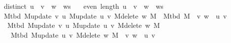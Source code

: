 \begin{isabellebody}
\ \ \ {\isachardoublequoteopen}distinct\ {\isacharparenleft}{\kern0pt}u\ {\isacharhash}{\kern0pt}\ v\ {\isacharhash}{\kern0pt}\ w\ {\isacharhash}{\kern0pt}\ ws{\isacharparenright}{\kern0pt}{\isachardoublequoteclose}\isanewline
\ \ \ {\isachardoublequoteopen}even\ {\isacharparenleft}{\kern0pt}length\ {\isacharparenleft}{\kern0pt}u\ {\isacharhash}{\kern0pt}\ v\ {\isacharhash}{\kern0pt}\ w\ {\isacharhash}{\kern0pt}\ ws{\isacharparenright}{\kern0pt}{\isacharparenright}{\kern0pt}{\isachardoublequoteclose}\isanewline
\ \ \ {\isachardoublequoteopen}M{\isacharunderscore}{\kern0pt}tbd\ {\isacharparenleft}{\kern0pt}M{\isacharunderscore}{\kern0pt}update\ v\ u\ {\isacharparenleft}{\kern0pt}M{\isacharunderscore}{\kern0pt}update\ u\ v\ {\isacharparenleft}{\kern0pt}M{\isacharunderscore}{\kern0pt}delete\ w\ M{\isacharparenright}{\kern0pt}{\isacharparenright}{\kern0pt}{\isacharparenright}{\kern0pt}\ {\isacharequal}{\kern0pt}\ M{\isacharunderscore}{\kern0pt}tbd\ M\ {\isacharminus}{\kern0pt}\ {\isacharbraceleft}{\kern0pt}{\isacharbraceleft}{\kern0pt}v{\isacharcomma}{\kern0pt}\ w{\isacharbraceright}{\kern0pt}{\isacharbraceright}{\kern0pt}\ {\isasymunion}\ {\isacharbraceleft}{\kern0pt}{\isacharbraceleft}{\kern0pt}u{\isacharcomma}{\kern0pt}\ v{\isacharbraceright}{\kern0pt}{\isacharbraceright}{\kern0pt}{\isachardoublequoteclose}%
\endisataginvisible
{\isafoldinvisible}%
%
\isadeliminvisible
\isanewline
%
\endisadeliminvisible
%
\isadelimproof
%
\endisadelimproof
%
\isatagproof
{}\isamarkupfalse%
\ {\isacharminus}{\kern0pt}\isanewline
\ \ \isamarkupfalse%
\isanewline
\ \ \ \ {\isachardoublequoteopen}M{\isacharunderscore}{\kern0pt}tbd\ {\isacharparenleft}{\kern0pt}M{\isacharunderscore}{\kern0pt}update\ v\ u\ {\isacharparenleft}{\kern0pt}M{\isacharunderscore}{\kern0pt}update\ u\ v\ {\isacharparenleft}{\kern0pt}M{\isacharunderscore}{\kern0pt}delete\ w\ M{\isacharparenright}{\kern0pt}{\isacharparenright}{\kern0pt}{\isacharparenright}{\kern0pt}\ {\isacharequal}{\kern0pt}\isanewline
\ \ \ \ \ M{\isacharunderscore}{\kern0pt}tbd\ {\isacharparenleft}{\kern0pt}M{\isacharunderscore}{\kern0pt}update\ u\ v\ {\isacharparenleft}{\kern0pt}M{\isacharunderscore}{\kern0pt}delete\ w\ M{\isacharparenright}{\kern0pt}{\isacharparenright}{\kern0pt}\ {\isacharminus}{\kern0pt}\ {\isacharbraceleft}{\kern0pt}{\isacharbraceleft}{\kern0pt}v{\isacharcomma}{\kern0pt}\ w{\isacharbraceright}{\kern0pt}{\isacharbraceright}{\kern0pt}\ {\isasymunion}\ {\isacharbraceleft}{\kern0pt}{\isacharbraceleft}{\kern0pt}u{\isacharcomma}{\kern0pt}\ v{\isacharbraceright}{\kern0pt}{\isacharbraceright}{\kern0pt}{\isachardoublequoteclose}\isanewline

\end{isabellebody}

